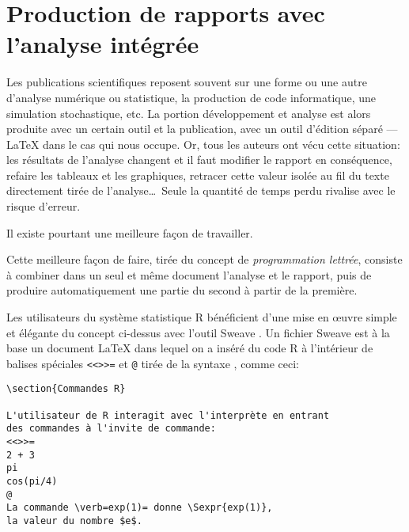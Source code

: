 \section{Production de rapports avec l'analyse intégrée}
\label{sec:trucs:sweave}

Les publications scientifiques reposent souvent sur une forme ou une
autre d'analyse numérique ou statistique, la production de code
informatique, une simulation stochastique, etc. La portion
développement et analyse est alors produite avec un certain outil
et la publication, avec un outil d'édition séparé --- {\LaTeX} dans le cas
qui nous occupe. Or, tous les auteurs ont vécu cette situation: les
résultats de l'analyse changent et il faut modifier le rapport en
conséquence, refaire les tableaux et les graphiques, retracer cette
valeur isolée au fil du texte directement tirée de l'analyse\dots\
Seule la quantité de temps perdu rivalise avec le risque d'erreur.

Il existe pourtant une meilleure façon de travailler.

Cette meilleure façon de faire, tirée du concept de
\emph{programmation lettrée}, consiste à combiner dans un seul et même
document l'analyse et le rapport, puis de produire automatiquement une
partie du second à partir de la première.

Les utilisateurs du système statistique R bénéficient d'une mise en
œuvre simple et élégante du concept ci-dessus avec l'outil Sweave
\citep{Sweave}. Un fichier Sweave est à la base un document {\LaTeX}
dans lequel on a inséré du code R à l'intérieur de balises spéciales
\verb|<<>>=| et \verb|@| tirée de la syntaxe \code{noweb}
\citep{noweb}, comme ceci:
\begin{lstlisting}
\section{Commandes R}

L'utilisateur de R interagit avec l'interprète en entrant
des commandes à l'invite de commande:
<<>>=
2 + 3
pi
cos(pi/4)
@
La commande \verb=exp(1)= donne \Sexpr{exp(1)},
la valeur du nombre $e$.
\end{lstlisting}


